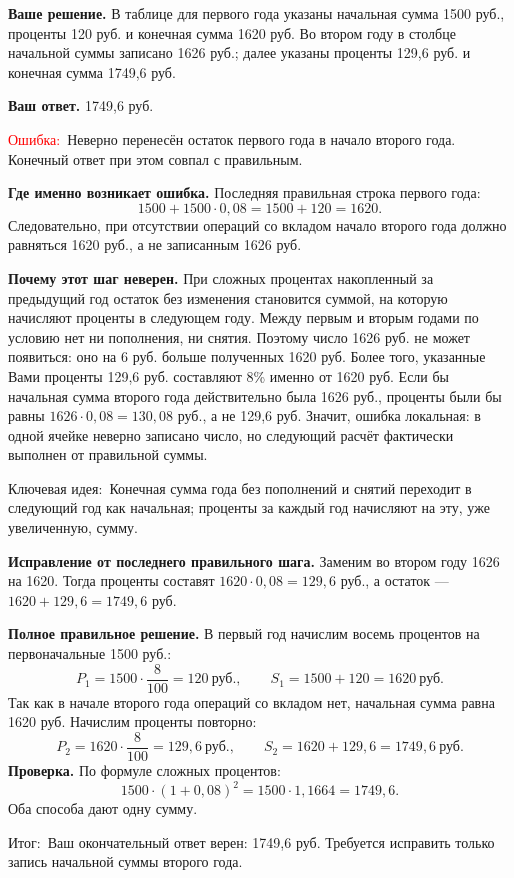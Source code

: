 \documentclass[12pt,a4paper]{article}
\newcommand{\err}{\textcolor{red}{Ошибка:}}
\newcommand{\idea}{\textcolor{blue!60!black}{Ключевая идея:}}
\newcommand{\result}{\textcolor{teal!60!black}{Итог:}}
\begin{document}
\textbf{Ваше решение.} В таблице для первого года указаны начальная сумма 1500 руб., проценты 120 руб. и конечная сумма 1620 руб. Во втором году в столбце начальной суммы записано 1626 руб.; далее указаны проценты 129,6 руб. и конечная сумма 1749,6 руб.

\textbf{Ваш ответ.} 1749,6 руб.

\err\ Неверно перенесён остаток первого года в начало второго года. Конечный ответ при этом совпал с правильным.

\textbf{Где именно возникает ошибка.} Последняя правильная строка первого года:
\[
1500+1500\cdot0{,}08=1500+120=1620.
\]
Следовательно, при отсутствии операций со вкладом начало второго года должно равняться 1620 руб., а не записанным 1626 руб.

\textbf{Почему этот шаг неверен.} При сложных процентах накопленный за предыдущий год остаток без изменения становится суммой, на которую начисляют проценты в следующем году. Между первым и вторым годами по условию нет ни пополнения, ни снятия. Поэтому число 1626 руб. не может появиться: оно на 6 руб. больше полученных 1620 руб. Более того, указанные Вами проценты 129,6 руб. составляют 8\% именно от 1620 руб. Если бы начальная сумма второго года действительно была 1626 руб., проценты были бы равны $1626\cdot0{,}08=130{,}08$ руб., а не 129,6 руб. Значит, ошибка локальная: в одной ячейке неверно записано число, но следующий расчёт фактически выполнен от правильной суммы.

\idea\ Конечная сумма года без пополнений и снятий переходит в следующий год как начальная; проценты за каждый год начисляют на эту, уже увеличенную, сумму.

\textbf{Исправление от последнего правильного шага.} Заменим во втором году 1626 на 1620. Тогда проценты составят $1620\cdot0{,}08=129{,}6$ руб., а остаток --- $1620+129{,}6=1749{,}6$ руб.

\textbf{Полное правильное решение.} В первый год начислим восемь процентов на первоначальные 1500 руб.:
\[
P_1=1500\cdot\frac{8}{100}=120\ \text{руб.},\qquad
S_1=1500+120=1620\ \text{руб.}
\]
Так как в начале второго года операций со вкладом нет, начальная сумма равна 1620 руб. Начислим проценты повторно:
\[
P_2=1620\cdot\frac{8}{100}=129{,}6\ \text{руб.},\qquad
S_2=1620+129{,}6=1749{,}6\ \text{руб.}
\]
\textbf{Проверка.} По формуле сложных процентов:
\[
1500\cdot(1+0{,}08)^2=1500\cdot1{,}1664=1749{,}6.
\]
Оба способа дают одну сумму.

\result\ Ваш окончательный ответ верен: 1749,6 руб. Требуется исправить только запись начальной суммы второго года.
\end{document}
